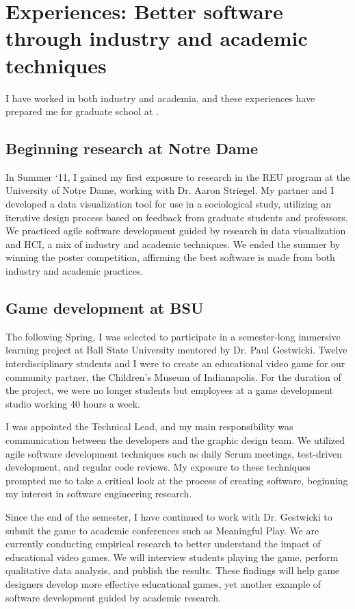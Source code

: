 \section*{Experiences: Better software through industry and academic techniques}
I have worked in both industry and academia, and these experiences have prepared me for graduate school at \schoolShort.

\subsection{Beginning research at Notre Dame}
In Summer ‘11, I gained my first exposure to research in the REU program at the University of Notre Dame, working with Dr. Aaron Striegel. 
My partner and I developed a data visualization tool for use in a sociological study, utilizing an iterative design process based on feedback from graduate students and professors. 
We practiced agile software development guided by research in data visualization and HCI, a mix of industry and academic techniques. 
We ended the summer by winning the poster competition, affirming the best software is made from both industry and academic practices.

\subsection{Game development at BSU}
The following Spring, I was selected to participate in a semester-long immersive learning project at Ball State University mentored by Dr. Paul Gestwicki. 
Twelve interdisciplinary students and I were to create an educational video game for our community partner, the Children’s Museum of Indianapolis. 
For the duration of the project, we were no longer students but employees at a game development studio working 40 hours a week. 

I was appointed the Technical Lead, and my main responsibility was communication between the developers and the graphic design team. 
We utilized agile software development techniques such as daily Scrum meetings, test-driven development, and regular code reviews. 
My exposure to these techniques prompted me to take a critical look at the process of creating software, beginning my interest in software engineering research.

Since the end of the semester, I have continued to work with Dr. Gestwicki to submit the game to academic conferences such as Meaningful Play. 
We are currently conducting empirical research to better understand the impact of educational video games. 
We will interview students playing the game, perform qualitative data analysis, and publish the results. 
These findings will help game designers develop more effective educational games, yet another example of software development guided by academic research.

